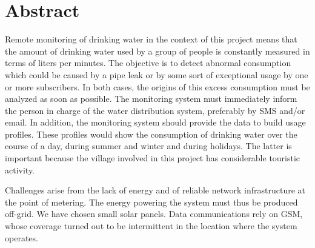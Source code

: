 \chapter*{Abstract}

Remote monitoring of drinking water in the context of this project means that the amount of drinking water
used by a group of people is constantly measured in terms of liters per minutes.
The objective is to detect abnormal consumption which could be caused by a pipe leak or by some sort of
exceptional usage by one or more subscribers. In both cases, the origins of this excess consumption
must be analyzed as soon as possible. The monitoring system must immediately inform the person in charge of the water
distribution system, preferably by SMS and/or email. In addition, the monitoring system should provide the data
to build usage profiles. These profiles would show the consumption of drinking water over the course of a day,
during summer and winter and during holidays. The latter is important because the village involved
in this project has considerable touristic activity.

Challenges arise from the lack of energy and of reliable network infrastructure at the point of
metering. The energy powering the
system must  thus be produced off-grid. We have chosen small solar panels.
Data communications rely on GSM, whose coverage
turned out to be intermittent in the location where the system operates.



